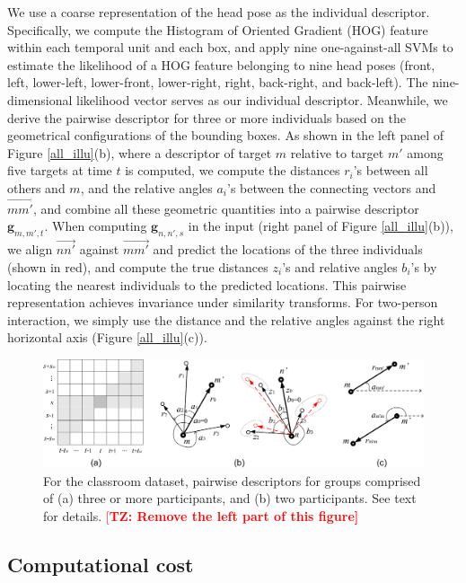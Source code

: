 \documentclass[10pt,twocolumn,letterpaper]{article}
\newcommand{\todd}[1]{\textcolor{red}{[\bf TZ: #1]}}
\begin{document}
We use a coarse representation of the head pose as the individual descriptor. Specifically, we compute the Histogram of Oriented Gradient (HOG) feature within each temporal unit and each box, and apply nine one-against-all SVMs to estimate the likelihood of a HOG feature belonging to nine head poses (front, left, lower-left, lower-front, lower-right, right, back-right, and back-left). The nine-dimensional likelihood vector  serves as our individual descriptor. Meanwhile, we derive the pairwise descriptor for three or more individuals based on the geometrical configurations of the bounding boxes. As shown in the left panel of Figure \ref{all_illu}(b), where a descriptor of target $m$ relative to target $m'$ among five targets at time $t$ is computed, we compute the distances $r_{i}$'s between all others and $m$, and the relative angles $a_{i}$'s between the connecting vectors and $\overrightarrow{mm'}$, and combine all these geometric quantities into a pairwise descriptor $\mathbf{g}_{m,m',t}$. When computing $\mathbf{g}_{n,n',s}$ in the input (right panel of Figure \ref{all_illu}(b)), we align $\overrightarrow{nn'}$ against $\overrightarrow{mm'}$ and predict the locations of the three individuals (shown in red), and compute the true distances $z_{i}$'s and relative angles $b_{i}$'s by locating the nearest individuals to the predicted locations. This pairwise representation achieves invariance under similarity transforms. For two-person interaction, we simply use the distance and the relative angles against the right horizontal axis (Figure \ref{all_illu}(c)). 

\begin{figure}[t]
\begin{center}
\includegraphics[scale=1.2]{all_illu.png}
\end{center}
\caption{For the classroom dataset, pairwise descriptors for groups comprised of (a) three or more participants, and (b) two participants. See text for details. \todd{Remove the left part of this figure}}
\label{fig:classroom-pairwise}
\end{figure}

\subsection{Computational cost}
\end{document}
